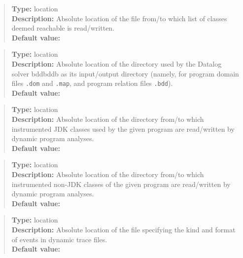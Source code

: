 \begin{quote}
{\bf Type:} location  \\
{\bf Description:} Absolute location of the file from/to which list of classes deemed reachable is read/written.  \\
{\bf Default value:} 
\end{quote}

\begin{quote}
{\bf Type:} location \\
{\bf Description:} Absolute location of the directory used by the Datalog solver bddbddb as its input/output directory (namely, for program domain files {\tt *.dom} and {\tt *.map}, and program relation files {\tt *.bdd}). \\
{\bf Default value:} 
\end{quote}

\begin{quote}
{\bf Type:} location \\
{\bf Description:} Absolute location of the directory from/to which instrumented JDK classes used by the given program are read/written by dynamic program analyses. \\
{\bf Default value:} 
\end{quote}

\begin{quote}
{\bf Type:} location  \\
{\bf Description:} Absolute location of the directory from/to which instrumented non-JDK classes of the given program are read/written by dynamic program analyses. \\
{\bf Default value:} 
\end{quote}

\begin{quote}
{\bf Type:} location \\
{\bf Description:} Absolute location of the file specifying the kind and format of events in dynamic trace files. \\
{\bf Default value:} 
\end{quote}

